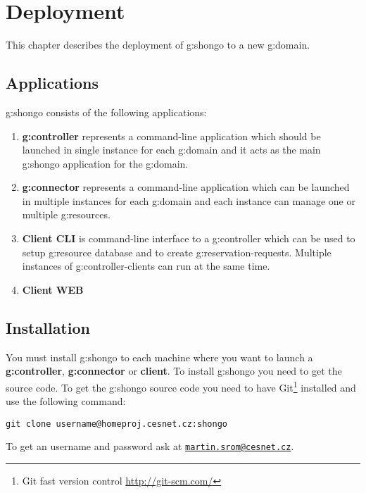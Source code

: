 \chapter{Deployment}

This chapter describes the deployment of \gls{g:shongo} to a new \gls{g:domain}.

\section{Applications}

\Gls{g:shongo} consists of the following applications:
\begin{enumerate}
\item \textbf{\Gls{g:controller}} represents a command-line application which should be launched in single instance for each \gls{g:domain} and it acts as the main \gls{g:shongo} application for the \gls{g:domain}.
\item \textbf{\Gls{g:connector}} represents a command-line application which can be launched in multiple instances for each \gls{g:domain} and each instance can manage one or multiple \glspl{g:resource}.
\item \textbf{Client CLI} is command-line interface to a \gls{g:controller} which can be used to setup \gls{g:resource} database and to create \glspl{g:reservation-request}. Multiple instances of \glspl{g:controller-client} can run at the same time.
\item \textbf{Client WEB} 
\end{enumerate}

\section{Installation}

You must install \gls{g:shongo} to each machine where you want to launch a \textbf{\gls{g:controller}}, \textbf{\gls{g:connector}} or \textbf{client}. To install \gls{g:shongo} you need to get the source code. To get the \gls{g:shongo} source code you need to have Git\footnote{Git fast version control \url{http://git-scm.com/}} installed and use the following command:
\begin{verbatim}
git clone username@homeproj.cesnet.cz:shongo
\end{verbatim}
To get an username and password ask at \href{mailto:martin.srom@cesnet.cz}{\texttt{martin.srom@cesnet.cz}}. 


